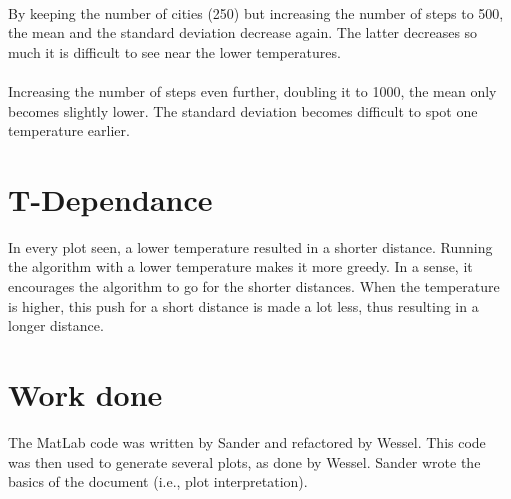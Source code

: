 \documentclass[10pt,a4paper]{article}
\begin{document}
 \\
By keeping the number of cities (250) but increasing the number of steps to 500, the mean and the standard deviation decrease again. The latter decreases so much it is difficult to see near the lower temperatures.\\

 \\
Increasing the number of steps even further, doubling it to 1000, the mean only becomes slightly lower. The standard deviation becomes difficult to spot one temperature earlier.\\

\section{T-Dependance}
In every plot seen, a lower temperature resulted in a shorter distance. Running the algorithm with a lower temperature makes it more greedy. In a sense, it encourages the algorithm to go for the shorter distances. When the temperature is higher, this push for a short distance is made a lot less, thus resulting in a longer distance.

\section{Work done}
The MatLab code was written by Sander and refactored by Wessel. 
This code was then used to generate several plots, as done by Wessel. Sander wrote the basics of the document (i.e., plot interpretation).
\end{document}
